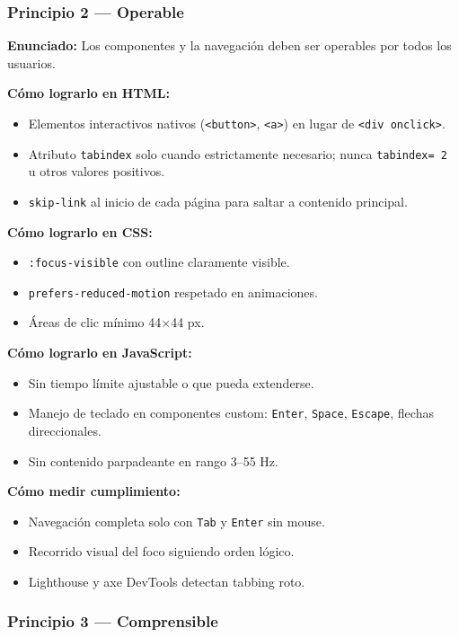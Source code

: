 \documentclass[11pt,a4paper,openany]{book}
\begin{document}
\subsubsection{Principio 2 --- Operable}

\textbf{Enunciado:} Los componentes y la navegación deben ser
operables por todos los usuarios.

\textbf{Cómo lograrlo en HTML:}
\begin{itemize}
\item Elementos interactivos nativos (\texttt{<button>},
\texttt{<a>}) en lugar de \texttt{<div onclick>}.
\item Atributo \texttt{tabindex} solo cuando estrictamente necesario;
nunca \texttt{tabindex= 2 } u otros valores positivos.
\item \texttt{skip-link} al inicio de cada página para saltar a
contenido principal.
\end{itemize}

\textbf{Cómo lograrlo en CSS:}
\begin{itemize}
\item \texttt{:focus-visible} con outline claramente visible.
\item \texttt{prefers-reduced-motion} respetado en animaciones.
\item Áreas de clic mínimo 44$\times$44 px.
\end{itemize}

\textbf{Cómo lograrlo en JavaScript:}
\begin{itemize}
\item Sin tiempo límite ajustable o que pueda extenderse.
\item Manejo de teclado en componentes custom: \texttt{Enter},
\texttt{Space}, \texttt{Escape}, flechas direccionales.
\item Sin contenido parpadeante en rango 3--55 Hz.
\end{itemize}

\textbf{Cómo medir cumplimiento:}
\begin{itemize}
\item Navegación completa solo con \texttt{Tab} y \texttt{Enter} sin
mouse.
\item Recorrido visual del foco siguiendo orden lógico.
\item Lighthouse y axe DevTools detectan tabbing roto.
\end{itemize}

\subsubsection{Principio 3 --- Comprensible}
\end{document}
